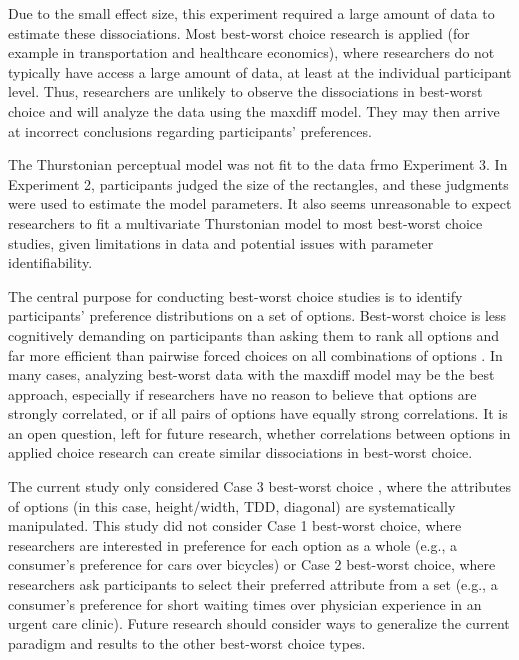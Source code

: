 Due to the small effect size, this experiment required a large amount of data to estimate these dissociations. Most best-worst choice research is applied (for example in transportation and healthcare economics), where researchers do not typically have access a large amount of data, at least at the individual participant level. Thus, researchers are unlikely to observe the dissociations in best-worst choice and will analyze the data using the maxdiff model. They may then arrive at incorrect conclusions regarding participants' preferences. 


The Thurstonian perceptual model was not fit to the data frmo Experiment 3. In Experiment 2, participants judged the size of the rectangles, and these judgments were used to estimate the model parameters. It also seems unreasonable to expect researchers to fit a multivariate Thurstonian model to most best-worst choice studies, given limitations in data and potential issues with parameter identifiability. 

The central purpose for conducting best-worst choice studies is to identify participants' preference distributions on a set of options. Best-worst choice is less cognitively demanding on participants than asking them to rank all options and far more efficient than pairwise forced choices on all combinations of options \parencite{louviere2008modeling}. In many cases, analyzing best-worst data with the maxdiff model may be the best approach, especially if researchers have no reason to believe that options are strongly correlated, or if all pairs of options have equally strong correlations. It is an open question, left for future research, whether correlations between options in applied choice research can create similar dissociations in best-worst choice. 

The current study only considered Case 3 best-worst choice \parencite{marleyModelsBestWorst2012}, where the attributes of options (in this case, height/width, TDD, diagonal) are systematically manipulated. This study did not consider Case 1 best-worst choice, where researchers are interested in preference for each option as a whole (e.g., a consumer's preference for cars over bicycles) or Case 2 best-worst choice, where researchers ask participants to select their preferred attribute from a set (e.g., a consumer's preference for short waiting times over physician experience in an urgent care clinic). Future research should consider ways to generalize the current paradigm and results to the other best-worst choice types.
